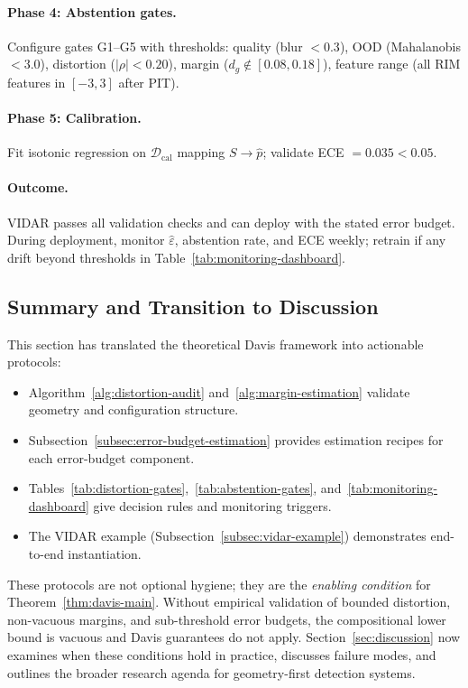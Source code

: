 \documentclass[11pt]{article}
\theoremstyle{remark}
\theoremstyle{plain}
\begin{document}
\paragraph{Phase 4: Abstention gates.}
Configure gates G1--G5 with thresholds: quality (blur $< 0.3$), OOD (Mahalanobis $< 3.0$), distortion ($|\rho| < 0.20$), margin ($d_g \notin [0.08, 0.18]$), feature range (all RIM features in $[-3,3]$ after PIT).

\paragraph{Phase 5: Calibration.}
Fit isotonic regression on $\mathcal{D}_{\mathrm{cal}}$ mapping $S \to \hat p$; validate ECE $= 0.035 < 0.05$.

\paragraph{Outcome.}
VIDAR passes all validation checks and can deploy with the stated error budget. During deployment, monitor $\hat\varepsilon$, abstention rate, and ECE weekly; retrain if any drift beyond thresholds in Table~\ref{tab:monitoring-dashboard}.

\subsection{Summary and Transition to Discussion}

This section has translated the theoretical Davis framework into actionable protocols:
\begin{itemize}[leftmargin=*]
  \item Algorithm~\ref{alg:distortion-audit} and~\ref{alg:margin-estimation} validate geometry and configuration structure.
  \item Subsection~\ref{subsec:error-budget-estimation} provides estimation recipes for each error-budget component.
  \item Tables~\ref{tab:distortion-gates},~\ref{tab:abstention-gates}, and~\ref{tab:monitoring-dashboard} give decision rules and monitoring triggers.
  \item The VIDAR example (Subsection~\ref{subsec:vidar-example}) demonstrates end-to-end instantiation.
\end{itemize}

These protocols are not optional hygiene; they are the \emph{enabling condition} for Theorem~\ref{thm:davis-main}. Without empirical validation of bounded distortion, non-vacuous margins, and sub-threshold error budgets, the compositional lower bound is vacuous and Davis guarantees do not apply. Section~\ref{sec:discussion} now examines when these conditions hold in practice, discusses failure modes, and outlines the broader research agenda for geometry-first detection systems.
\end{document}
